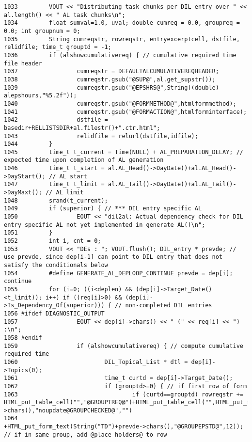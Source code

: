 \begin{verbatim}
1033         VOUT << "Distributing task chunks per DIL entry over " << al.length() << " AL task chunks\n";
1034         float sumval=1.0, uval; double cumreq = 0.0, groupreq = 0.0; int groupnum = 0;
1035         String cumreqstr, rowreqstr, entryexcerptcell, dstfile, relidfile; time_t grouptd = -1;
1036         if (alshowcumulativereq) { // cumulative required time file header
1037                 cumreqstr = DEFAULTALCUMULATIVEREQHEADER;
1038                 cumreqstr.gsub("@SUP@",al.get_supstr());
1039                 cumreqstr.gsub("@EPSHRS@",String((double) alepshours,"%5.2f"));
1040                 cumreqstr.gsub("@FORMMETHOD@",htmlformmethod);
1041                 cumreqstr.gsub("@FORMACTION@",htmlforminterface);
1042                 dstfile = basedir+RELLISTSDIR+al.filestr()+".ctr.html";
1043                 relidfile = relurl(dstfile,idfile);
1044         }
1045         time_t t_current = Time(NULL) + AL_PREPARATION_DELAY; // expected time upon completion of AL generation
1046         time_t t_start = al.AL_Head()->DayDate()+al.AL_Head()->DayStart(); // AL start
1047         time_t t_limit = al.AL_Tail()->DayDate()+al.AL_Tail()->DayMaxt(); // AL limit
1048         srand(t_current);
1049         if (superior) { // *** DIL entry specific AL
1050                 EOUT << "dil2al: Actual dependency check for DIL entry specific AL not yet implemented in generate_AL()\n";
1051         }
1052         int i, cnt = 0;
1053         VOUT << "DEs : "; VOUT.flush(); DIL_entry * prevde; // use prevde, since dep[i-1] can point to DIL entry that does not satisfy the conditionals below
1054         #define GENERATE_AL_DEPLOOP_CONTINUE prevde = dep[i]; continue
1055         for (i=0; ((i<deplen) && (dep[i]->Target_Date()<t_limit)); i++) if ((req[i]>0) && (dep[i]->Is_Dependency_Of(superior))) { // non-completed DIL entries
1056 #ifdef DIAGNOSTIC_OUTPUT
1057                 EOUT << dep[i]->chars() << " (" << req[i] << ") :\n";
1058 #endif
1059                 if (alshowcumulativereq) { // compute cumulative required time
1060                         DIL_Topical_List * dtl = dep[i]->Topics(0);
1061                         time_t curtd = dep[i]->Target_Date();
1062                         if (grouptd>=0) { // if first row of form
1063                                 if (curtd==grouptd) rowreqstr += HTML_put_table_cell("","@GROUPTREQ@")+HTML_put_table_cell("",HTML_put_form_checkbox(String("TDCHKBX")+prevde->chars(),"noupdate@GROUPCHECKED@","")
1064                                         +HTML_put_form_text(String("TD")+prevde->chars(),"@GROUPEPSTD@",12)); // if in same group, add @place holders@ to row

\end{verbatim}
